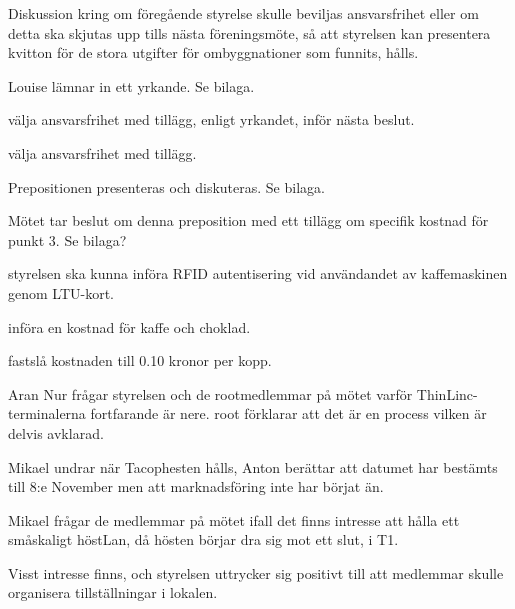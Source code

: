 \documentclass{protokoll}
\begin{document}
Diskussion kring om föregående styrelse skulle beviljas ansvarsfrihet eller om
detta ska skjutas upp tills nästa föreningsmöte, så att styrelsen kan 
presentera kvitton för de stora utgifter för ombyggnationer som funnits, hålls. 

Louise lämnar in ett yrkande. Se bilaga.

\begin{beslut}
  \att välja ansvarsfrihet med tillägg, enligt yrkandet, inför nästa beslut.
\end{beslut}

\begin{beslut}
  \att välja ansvarsfrihet med tillägg.
\end{beslut}

Prepositionen presenteras och diskuteras. Se bilaga. 


Mötet tar beslut om denna preposition med ett tillägg om specifik kostnad för
punkt 3. Se bilaga?

\begin{beslut}
  \att styrelsen ska kunna införa RFID autentisering vid användandet av
  kaffemaskinen genom LTU-kort.
\end{beslut}

\begin{beslut}
  \att införa en kostnad för kaffe och choklad.
\end{beslut}

\begin{beslut}
  \att fastslå kostnaden till 0.10 kronor per kopp.
\end{beslut}

Aran Nur frågar styrelsen och de rootmedlemmar på mötet varför
ThinLinc-terminalerna fortfarande är nere. root förklarar att det är en process
vilken är delvis avklarad. 

Mikael undrar när Tacophesten hålls, Anton berättar att datumet har bestämts
till 8:e November men att marknadsföring inte har börjat än. 

Mikael frågar de medlemmar på mötet ifall det finns intresse att hålla ett
småskaligt höstLan, då hösten börjar dra sig mot ett slut, i T1.  

Visst intresse finns, och styrelsen uttrycker sig positivt till att medlemmar
skulle organisera tillställningar i lokalen. 
\end{document}
